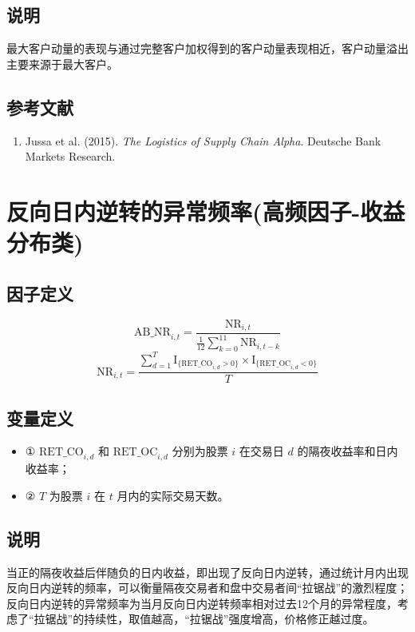 \documentclass{article}
\begin{document}
\subsection{说明}
最大客户动量的表现与通过完整客户加权得到的客户动量表现相近，客户动量溢出主要来源于最大客户。

\subsection{参考文献}
\begin{enumerate}
    \item Jussa et al. (2015). \textit{The Logistics of Supply Chain Alpha}. Deutsche Bank Markets Research.
\end{enumerate}

\section{反向日内逆转的异常频率(高频因子-收益分布类)}

\subsection{因子定义}

\begin{equation}
    \mathrm{AB\_NR}_{i,t} = \frac{\mathrm{NR}_{i,t}}{\frac{1}{12} \sum_{k=0}^{11} \mathrm{NR}_{i,t-k}}
\end{equation}
\begin{equation}
    \mathrm{NR}_{i,t} = \frac{\sum_{d=1}^{T} \mathrm{I}_{\{\mathrm{RET\_CO}_{i,d}>0\}} \times \mathrm{I}_{\{\mathrm{RET\_OC}_{i,d}<0\}}}{T}
\end{equation}

\subsection{变量定义}
\begin{itemize}
    \item ① \( \mathrm{RET\_CO}_{i,d} \) 和 \( \mathrm{RET\_OC}_{i,d} \) 分别为股票 \( i \) 在交易日 \( d \) 的隔夜收益率和日内收益率；
    \item ② \( T \) 为股票 \( i \) 在 \( t \) 月内的实际交易天数。
\end{itemize}

\subsection{说明}
当正的隔夜收益后伴随负的日内收益，即出现了反向日内逆转，通过统计月内出现反向日内逆转的频率，可以衡量隔夜交易者和盘中交易者间“拉锯战”的激烈程度；反向日内逆转的异常频率为当月反向日内逆转频率相对过去12个月的异常程度，考虑了“拉锯战”的持续性，取值越高，“拉锯战”强度增高，价格修正越过度。
\end{document}
